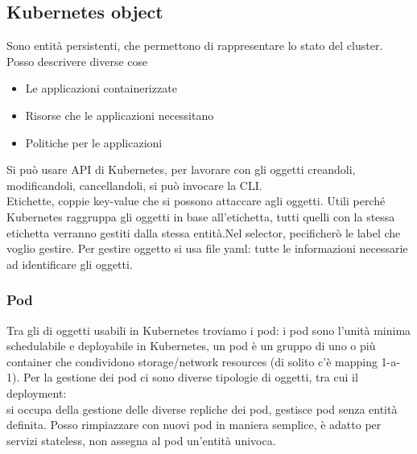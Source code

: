 \documentclass{article}
\begin{document}
\subsection{Kubernetes object}
Sono entità persistenti, che permettono di rappresentare lo stato del cluster. Posso descrivere diverse cose
\begin{itemize}
\item Le applicazioni containerizzate
\item Risorse che le applicazioni necessitano
\item Politiche per le applicazioni
\end{itemize}
Si può usare API di Kubernetes, per lavorare con gli oggetti creandoli, modificandoli, cancellandoli, si può invocare la CLI.\\
Etichette, coppie key-value che si possono attaccare agli oggetti. Utili perché Kubernetes raggruppa gli oggetti in base all'etichetta, tutti quelli con la stessa etichetta verranno gestiti dalla stessa entità.Nel selector, pecificherò le label che voglio gestire. Per gestire oggetto si usa file yaml: tutte le informazioni necessarie ad identificare gli oggetti.
\subsubsection{Pod} 
Tra gli di oggetti usabili in Kubernetes troviamo i pod: i pod sono l'unità minima schedulabile e deployabile in Kubernetes, un pod è un gruppo di uno o più container che condividono storage/network resources (di solito c'è mapping 1-a-1). Per la gestione dei pod ci sono diverse tipologie di oggetti, tra cui il deployment:\\
si occupa della gestione delle diverse repliche dei pod, gestisce pod senza entità definita. Posso rimpiazzare con nuovi pod in maniera semplice, è adatto per servizi stateless, non assegna al pod un'entità univoca.
\end{document}
